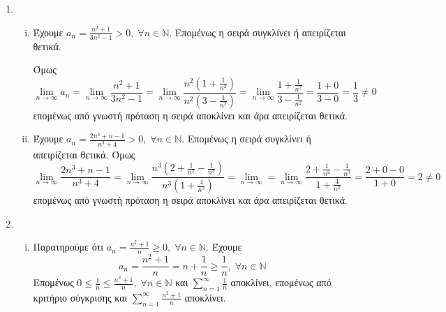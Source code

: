


\everymath{\displaystyle}
\setcounter{chapter}{1}




\begin{center}
\end{center}

\vspace{\baselineskip}

\begin{enumerate}
    \item 
    \begin{enumerate}[i)]
        \item Έχουμε $ a_{n}= \frac{n^{2}+1}{3n^{2}-1} > 0, \; \forall n \in 
            \mathbb{N} $. Επομένως η σειρά συγκλίνει ή απειρίζεται θετικά.

            Όμως \[ \lim_{n \to \infty} a_{n} = \lim_{n \to \infty} 
                \frac{n^{2}+1}{3n^{2}-1} = \lim_{n \to \infty} 
                \frac{n^{2}(1+ \frac{1}{n^{{2}}})}{n^{2}(3- \frac{1}{n^{2}})} = 
                \lim_{n \to \infty} \frac{1 + \frac{1}{n^{2}}}{3- \frac{1}{n^{2}}} = 
                \frac{1+0}{3-0} = \frac{1}{3} \neq 0
            \] επομένως από γνωστή πρόταση η σειρά αποκλίνει και άρα απειρίζεται 
            θετικά.

        \item Έχουμε $ a_{n}= \frac{2n^{3}+n-1}{n^{3}+4} > 0, \; \forall n \in 
            \mathbb{N} $. Επομένως η σειρά συγκλίνει ή απειρίζεται θετικά.
            Όμως
            \[
                \lim_{n \to \infty} \frac{2n^{3}+n-1}{n^{3}+4} = \lim_{n \to \infty}
                \frac{n^{3}(2+ \frac{1}{n^{2}}- \frac{1}{n^{3}})}{n^{3}
                (1+ \frac{4}{n^{3}})} = \lim_{n \to \infty} = 
                \lim_{n \to \infty} \frac{2+ \frac{1}{n^{2}}- 
                \frac{1}{n^{3}}}{1 + \frac{4}{n^{3}}} =  
                \frac{2+0-0}{1+0} = 2 \neq 0
            \]
            επομένως από γνωστή πρόταση η σειρά αποκλίνει και 
            άρα απειρίζεται θετικά. 
    \end{enumerate}

\item 
    \begin{enumerate}[i)]
        \item Παρατηρούμε ότι $ a_{n} = \frac{n^{2}+1}{n} \geq 0, \; \forall n 
            \in \mathbb{N} $. Έχουμε 
            \[
                a_{n} = \frac{n^{2}+1}{n} = n + \frac{1}{n} \geq 
                \frac{1}{n}, \; \forall n \in \mathbb{N}  
            \]
            Επομένως $ 0 \leq \frac{1}{n} \leq \frac{n^{2}+1}{n}, \; \forall n \in
            \mathbb{N}  $ και $ \sum_{n=1}^{\infty} \frac{1}{n} $ αποκλίνει, επομένως 
            από κριτήριο σύγκρισης και $ \sum_{n=1}^{\infty} \frac{n^{2}+1}{n} $ 
            αποκλίνει.


\end{enumerate}
\end{enumerate}
